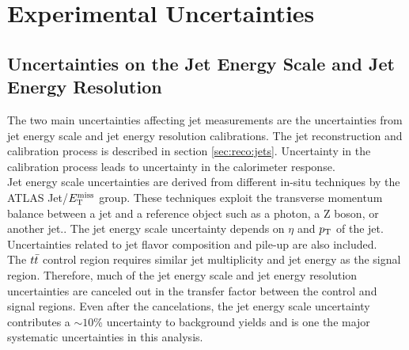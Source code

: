 \section{Experimental Uncertainties}
\label{sec:ExpSystematics}


\subsection{Uncertainties on the Jet Energy Scale and Jet Energy Resolution } 

\indent The two main uncertainties affecting jet measurements are the uncertainties from jet energy scale and jet energy resolution calibrations. The jet reconstruction and calibration process is described in section \ref{sec:reco:jets}.  Uncertainty in the calibration process leads to uncertainty in the calorimeter response. \\

\indent Jet energy scale uncertainties are derived from different in-situ techniques by the ATLAS Jet/$E_{\mathrm{T}}^{\mathrm{miss}}$ group.  These techniques exploit the transverse momentum balance between a jet and a reference object such as a photon, a Z boson, or another jet.\cite{JES_dijet, JES_ZGamma}.  The jet energy scale uncertainty depends on $\eta$ and $p_{\mathrm{T}}$ of the jet.  Uncertainties related to jet flavor composition and pile-up are also included.  \\

\indent  The $t\bar{t}$ control region requires similar jet multiplicity and jet energy as the signal region.  Therefore, much of the jet energy scale and jet energy resolution uncertainties are canceled out in the transfer factor between the control and signal regions.  Even after the cancelations, the jet energy scale uncertainty contributes a $\sim10$\% uncertainty to background yields and is one the major systematic uncertainties in this analysis.  \\

